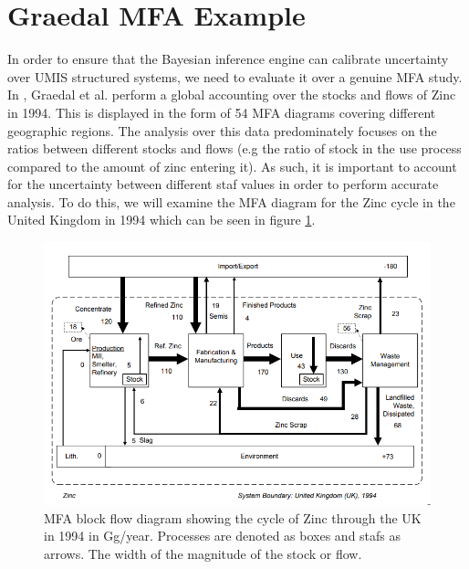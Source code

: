 \documentclass[ %
                    author={Tom Jager},
                supervisor={Dr. Daniel Schien},
                    degree={MEng},
                     title={A Bayesian Inference Engine for Calibrating Uncertainty over UMIS Structured MFA Systems},
                  subtitle={},
                      type={research},
                      year={2019} ]{dissertation}
\begin{document}

\section{Graedal MFA Example}
\label{sec:graedal_example}
In order to ensure that the Bayesian inference engine can calibrate uncertainty over UMIS structured systems, we need to evaluate it over a genuine MFA study. In \cite{graedel2005multilevel}, Graedal et al. perform a global accounting over the stocks and flows of Zinc in 1994. This is displayed in the form of 54 MFA diagrams covering different geographic regions. The analysis over this data predominately focuses on the ratios between different stocks and flows (e.g the ratio of stock in the use process compared to the amount of zinc entering it). As such, it is important to account for the uncertainty between different staf values in order to perform accurate analysis. To do this, we will examine the MFA diagram for the Zinc cycle in the United Kingdom in 1994 which can be seen in figure \ref{fig:zinc_uk_mfa}.

\begin{figure}[h!]
    \centering
    \includegraphics[width=\linewidth]{images/zinc_uk_mfa.png}
    \caption{MFA block flow diagram showing the cycle of Zinc through the UK in 1994 in Gg/year. Processes are denoted as boxes and stafs as arrows. The width of the magnitude of the stock or flow.}
    \label{fig:zinc_uk_mfa}
\end{figure}
\end{document}
